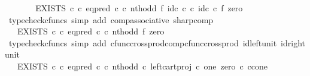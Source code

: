 \begin{isabellebody}
\ \ \isamarkupfalse%
\ \isamarkupfalse%
\ {\isachardoublequoteopen}{\isachardot}{\kern0pt}{\isachardot}{\kern0pt}{\isachardot}{\kern0pt}\ {\isacharequal}{\kern0pt}\ EXISTS\ {\isasymnat}\isactrlsub c\ {\isasymcirc}\isactrlsub c\ {\isacharparenleft}{\kern0pt}eq{\isacharunderscore}{\kern0pt}pred\ {\isasymnat}\isactrlsub c\ {\isasymcirc}\isactrlsub c\ {\isacharparenleft}{\kern0pt}nth{\isacharunderscore}{\kern0pt}odd\ {\isasymtimes}\isactrlsub f\ id\isactrlsub c\ {\isasymnat}\isactrlsub c{\isacharparenright}{\kern0pt}\ {\isasymcirc}\isactrlsub c\ {\isacharparenleft}{\kern0pt}id\isactrlsub c\ {\isasymnat}\isactrlsub c\ {\isasymtimes}\isactrlsub f\ zero{\isacharparenright}{\kern0pt}{\isacharparenright}{\kern0pt}\isactrlsup {\isasymsharp}{\isachardoublequoteclose}\isanewline
\ \ \ \ \isamarkupfalse%
\ {\isacharparenleft}{\kern0pt}typecheck{\isacharunderscore}{\kern0pt}cfuncs{\isacharcomma}{\kern0pt}\ simp\ add{\isacharcolon}{\kern0pt}\ comp{\isacharunderscore}{\kern0pt}associative{}\ sharp{\isacharunderscore}{\kern0pt}comp{\isacharparenright}{\kern0pt}\isanewline
\ \ \isamarkupfalse%
\ \isamarkupfalse%
\ {\isachardoublequoteopen}{\isachardot}{\kern0pt}{\isachardot}{\kern0pt}{\isachardot}{\kern0pt}\ {\isacharequal}{\kern0pt}\ EXISTS\ {\isasymnat}\isactrlsub c\ {\isasymcirc}\isactrlsub c\ {\isacharparenleft}{\kern0pt}eq{\isacharunderscore}{\kern0pt}pred\ {\isasymnat}\isactrlsub c\ {\isasymcirc}\isactrlsub c\ {\isacharparenleft}{\kern0pt}nth{\isacharunderscore}{\kern0pt}odd\ {\isasymtimes}\isactrlsub f\ zero{\isacharparenright}{\kern0pt}{\isacharparenright}{\kern0pt}\isactrlsup {\isasymsharp}{\isachardoublequoteclose}\isanewline
\ \ \ \ \isamarkupfalse%
\ {\isacharparenleft}{\kern0pt}typecheck{\isacharunderscore}{\kern0pt}cfuncs{\isacharcomma}{\kern0pt}\ simp\ add{\isacharcolon}{\kern0pt}\ cfunc{\isacharunderscore}{\kern0pt}cross{\isacharunderscore}{\kern0pt}prod{\isacharunderscore}{\kern0pt}comp{\isacharunderscore}{\kern0pt}cfunc{\isacharunderscore}{\kern0pt}cross{\isacharunderscore}{\kern0pt}prod\ id{\isacharunderscore}{\kern0pt}left{\isacharunderscore}{\kern0pt}unit{}\ id{\isacharunderscore}{\kern0pt}right{\isacharunderscore}{\kern0pt}unit{}{\isacharparenright}{\kern0pt}\isanewline
\ \ \isamarkupfalse%
\ \isamarkupfalse%
\ {\isachardoublequoteopen}{\isachardot}{\kern0pt}{\isachardot}{\kern0pt}{\isachardot}{\kern0pt}\ {\isacharequal}{\kern0pt}\ EXISTS\ {\isasymnat}\isactrlsub c\ {\isasymcirc}\isactrlsub c\ {\isacharparenleft}{\kern0pt}eq{\isacharunderscore}{\kern0pt}pred\ {\isasymnat}\isactrlsub c\ {\isasymcirc}\isactrlsub c\ {\isasymlangle}nth{\isacharunderscore}{\kern0pt}odd\ {\isasymcirc}\isactrlsub c\ left{\isacharunderscore}{\kern0pt}cart{\isacharunderscore}{\kern0pt}proj\ {\isasymnat}\isactrlsub c\ one{\isacharcomma}{\kern0pt}\ zero\ {\isasymcirc}\isactrlsub c\ {\isasymbeta}\isactrlbsub {\isasymnat}\isactrlsub c{\isasymtimes}\isactrlsub cone\isactrlesub {\isasymrangle}\ {\isacharparenright}{\kern0pt}\isactrlsup {\isasymsharp}{\isachardoublequoteclose}\isanewline

\end{isabellebody}
